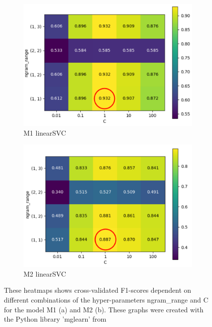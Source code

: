 \begin{figure}[ht]
 \begin{subfigure}{0.5\textwidth}
   \centering
   \includegraphics[width=0.9\linewidth]{img/m1_F1_ngram_C_heatmap_w_Circle.pdf}
   \caption{M1 linearSVC}
   \label{fig:m1_heatmap}
\end{subfigure}
\begin{subfigure}{0.5\textwidth}
   \centering
   \includegraphics[width=0.9\linewidth]{img/m2_ngram_C_heatmap_new_w_circle.pdf}
   \caption{M2 linearSVC}
   \label{fig:m2_heatmap}
 \end{subfigure}
\caption{These heatmaps shows cross-validated F1-scores dependent on different combinations of the hyper-parameters ngram\_range and C for the model M1 (a) and M2 (b). These graphs were created with the Python library 'mglearn' from \parencite{Guido2016}}
\label{fig:heatmaps}
\end{figure}

